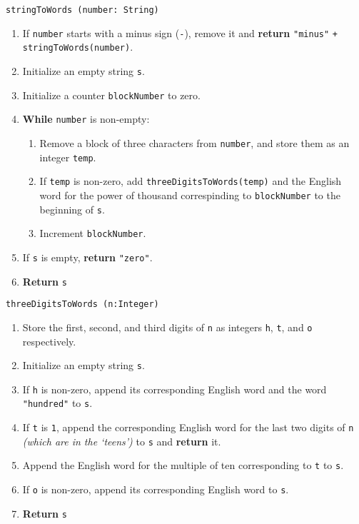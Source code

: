 \vspace{5mm}
\texttt{stringToWords (number: String)}
\begin{enumerate}
	\item If \texttt{number} starts with a minus sign (\texttt{-}), remove it and \textbf{return} \texttt{"minus"}
		\newline\texttt{+} \texttt{stringToWords(number)}.
	\item Initialize an empty string \texttt{s}.
	\item Initialize a counter \texttt{blockNumber} to zero. 
	\item \textbf{While} \texttt{number} is non-empty:
	\begin{enumerate}
		\item Remove a block of three characters from \texttt{number}, and store them as an integer \texttt{temp}.
		\item If \texttt{temp} is non-zero, add \texttt{threeDigitsToWords(temp)} and the English word for
			the power of thousand correspinding to \texttt{blockNumber} to the beginning of \texttt{s}.
		\item Increment \texttt{blockNumber}.
	\end{enumerate}
	\item If \texttt{s} is empty, \textbf{return} \texttt{"zero"}.
	\item \textbf{Return} \texttt{s} 
\end{enumerate}
\vspace{5mm}
\texttt{threeDigitsToWords (n:Integer)}
\begin{enumerate}
	\item Store the first, second, and third digits of \texttt{n} as integers \texttt{h}, \texttt{t}, and \texttt{o} respectively.
	\item Initialize an empty string \texttt{s}.
	\item If \texttt{h} is non-zero, append its corresponding English word and the word \texttt{"hundred"} to \texttt{s}.
	\item If \texttt{t} is \texttt{1}, append the corresponding English word for the last two digits of \texttt{n} \textit{(which are in the `teens')}
		to \texttt{s} and \textbf{return} it.
	\item Append the English word for the multiple of ten corresponding to \texttt{t} to \texttt{s}.
	\item If \texttt{o} is non-zero, append its corresponding English word to \texttt{s}.
	\item \textbf{Return} \texttt{s} 
\end{enumerate}

